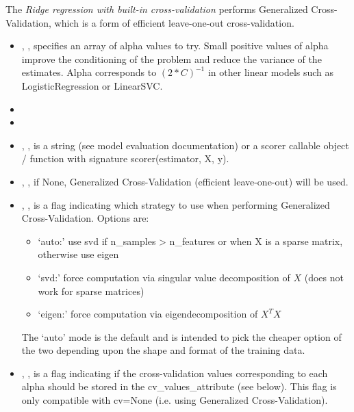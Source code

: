 The \textit{Ridge regression with built-in cross-validation} performs
Generalized Cross-Validation, which is a form of efficient leave-one-out
cross-validation.
%
\begin{itemize}
  \item {}, , specifies
  an array of alpha values to try.
  Small positive values of alpha improve the conditioning of the problem and
  reduce the variance of the estimates.
  Alpha corresponds to $(2*C)^{-1}$ in other linear models such as
  LogisticRegression or LinearSVC.
  \item {}
  \item {}
  \item {}, , is a
  string (see model evaluation documentation) or a scorer callable object /
  function with signature scorer(estimator, X, y).
  \item {}, , if
  None, Generalized Cross-Validation (efficient leave-one-out) will be used.
  \item {}, , is a flag indicating which strategy to use when performing Generalized
  Cross-Validation.
  Options are:
	\begin{itemize}
    \item `auto:' use svd if n\_samples > n\_features or when X is a
    sparse matrix, otherwise use eigen
  	\item `svd:' force computation via singular value decomposition of $X$
    (does not work for sparse matrices)
	  \item `eigen:' force computation via eigendecomposition of $X^T X$
	\end{itemize}
	The `auto' mode is the default and is intended to pick the cheaper
  option of the two depending upon the shape and format of the training data.
  \item {}, , is a flag indicating if
  the cross-validation values corresponding to each alpha should be stored in
  the cv\_values\_attribute (see below).
  This flag is only compatible with cv=None (i.e. using Generalized
  Cross-Validation).
\end{itemize}

